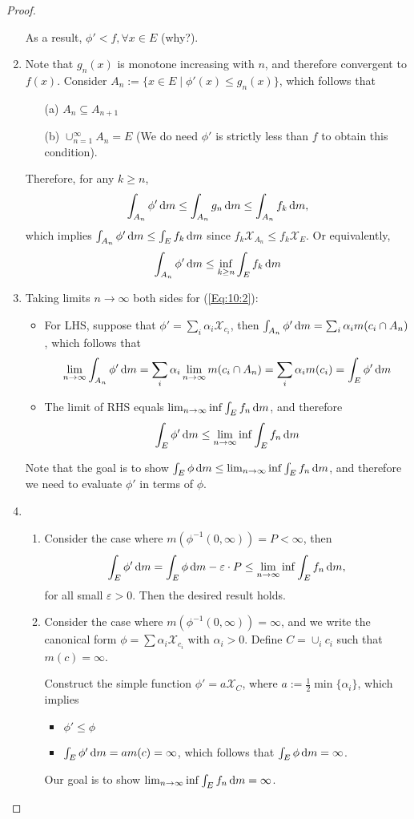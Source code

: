 \begin{proof}
\begin{enumerate}
As a result, $\phi'<f,\forall x\in E$ (why?).
\item
Note that $g_n(x)$ is monotone increasing with $n$, and therefore convergent to $f(x)$.
Consider $A_n:=\{x\in E\mid \phi'(x)\le g_n(x)\}$, which follows that
\begin{itemize}
\item[(a)]
$A_n\subseteq A_{n+1}$
\item[(b)]
$\cup_{n=1}^\infty A_n=E$ (We do need $\phi'$ is strictly less than $f$ to obtain this condition).
\end{itemize}
Therefore, for any $k\ge n$,
\[
\int_{A_n}\phi'\,\mathrm{d} m\le \int_{A_n}g_n\,\mathrm{d} m\le 
\int_{A_n}f_k\,\mathrm{d} m,
\]
which implies $\int_{A_n}\phi'\,\mathrm{d} m\le \int_Ef_k\,\mathrm{d} m$ since $f_k\mathcal{X}_{A_n}\le f_k\mathcal{X}_{E}$.
Or equivalently,
\begin{equation}\label{Eq:10:2}
\int_{A_n}\phi'\diff m\le\inf_{k\ge n}\int_Ef_k\diff m
\end{equation}
\item
Taking limits $n\to\infty$ both sides for (\ref{Eq:10:2}):
\begin{itemize}
\item
For LHS, suppose that $\phi'=\sum_i\alpha_i\mathcal{X}_{c_i}$, then $\int_{A_n}\phi'\,\mathrm{d} m=\sum_i\alpha_i m(c_i\cap A_n)$, which follows that
\[
\lim_{n\to\infty}\int_{A_n}\phi'\,\mathrm{d} m
=
\sum_i\alpha_i\lim_{n\to\infty}m(c_i\cap A_n)
=
\sum_i\alpha_im(c_i)=\int_E\phi'\,\mathrm{d} m
\]
\item
The limit of RHS equals $\lim_{n\to\infty}\inf\int_Ef_n\,\mathrm{d} m$, and therefore 
\[
\int_E\phi'\,\mathrm{d} m\le \lim_{n\to\infty}\inf\int_Ef_n\,\mathrm{d} m
\]
\end{itemize}
Note that the goal is to show $\int_E\phi\,\mathrm{d} m\le \lim_{n\to\infty}\inf\int_Ef_n\,\mathrm{d} m$, and therefore we need to evaluate $\phi'$ in terms of $\phi$.
\item
\begin{enumerate}
\item
Consider the case where $m(\phi^{-1}(0,\infty))=P<\infty$, then
\[
\int_E\phi'\,\mathrm{d} m = \int_E\phi\,\mathrm{d} m-\varepsilon\cdot P\le \lim_{n\to\infty}\inf\int_Ef_n\,\mathrm{d} m,
\]
for all small $\varepsilon>0$. Then the desired result holds.
\item
Consider the case where $m(\phi^{-1}(0,\infty)) = \infty$, and we write the canonical form $\phi=\sum\alpha_i\mathcal{X}_{c_i}$ with $\alpha_i>0$.
Define $C=\cup_ic_i$ such that $m(c)=\infty$.

Construct the simple function $\phi'=a\mathcal{X}_C$, where $a:=\frac{1}{2}\min\{\alpha_i\}$, which implies
\begin{itemize}
\item
$\phi'\le\phi$
\item
$\int_E\phi'\,\mathrm{d} m=am(c)=\infty$, which follows that $\int_E\phi\,\mathrm{d} m=\infty$.
\end{itemize}
Our goal is to show $\lim_{n\to\infty}\inf\int_Ef_n\,\mathrm{d} m=\infty$.


\end{enumerate}
\end{enumerate}
\end{proof}
